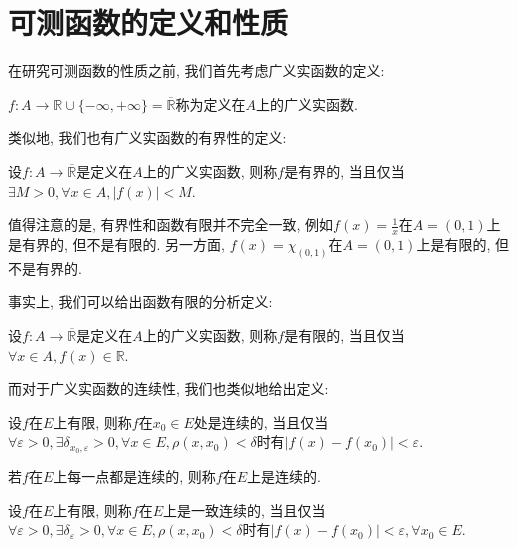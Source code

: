 \documentclass[theorem=false,mathfont=none,openany,sub3section]{easybook}
\begin{document}
\section{可测函数的定义和性质}

在研究可测函数的性质之前, 我们首先考虑广义实函数的定义:\par

\begin{definition}
  $f:A\rightarrow \mathbb{R}\cup\{-\infty,+\infty\}=\overline{\mathbb{R} }$称为定义在$A$上的广义实函数.\par
\end{definition}

类似地, 我们也有广义实函数的有界性的定义:\par

\begin{definition}
  设$f:A\rightarrow \overline{\mathbb{R} }$是定义在$A$上的广义实函数, 则称$f$是有界的, 当且仅当$\exists M>0, \forall x\in A, |f(x)|<M$.\par
\end{definition}

\begin{remark}
  值得注意的是, 有界性和函数有限并不完全一致, 例如$f(x)=\frac{1}{x}$在$A=(0,1)$上是有界的, 但不是有限的. 另一方面, $f(x)=\chi_{(0,1)}$在$A=(0,1)$上是有限的, 但不是有界的.\par
\end{remark}

事实上, 我们可以给出函数有限的分析定义:\par

\begin{definition}
  设$f:A\rightarrow \overline{\mathbb{R} }$是定义在$A$上的广义实函数, 则称$f$是有限的, 当且仅当$\forall x\in A, f(x)\in \mathbb{R}$.\par
\end{definition}

而对于广义实函数的连续性, 我们也类似地给出定义:\par

\begin{definition}
  设$f$在$E$上有限, 则称$f$在$x_0\in E$处是连续的, 当且仅当$ \forall \varepsilon >0, \exists \delta_{x_0,\varepsilon} >0, \forall x\in E, \rho(x,x_0)<\delta$时有$ |f(x)-f(x_0)|<\varepsilon$.\par
  若$f$在$E$上每一点都是连续的, 则称$f$在$E$上是连续的.\par
  设$f$在$E$上有限, 则称$f$在$E$上是一致连续的, 当且仅当$ \forall \varepsilon >0, \exists \delta_{\varepsilon} >0, \forall x\in E, \rho(x,x_0)<\delta$时有$ |f(x)-f(x_0)|<\varepsilon, \forall x_0 \in E$.\par
\end{definition}
\end{document}
